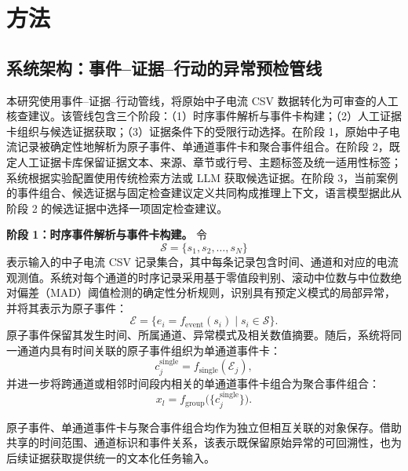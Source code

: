 \section{方法}
\subsection{系统架构：事件--证据--行动的异常预检管线}

本研究使用事件--证据--行动管线，将原始中子电流 CSV 数据转化为可审查的人工核查建议。该管线包含三个阶段：（1）时序事件解析与事件卡构建；（2）人工证据卡组织与候选证据获取；（3）证据条件下的受限行动选择。在阶段 1，原始中子电流记录被确定性地解析为原子事件、单通道事件卡和聚合事件组合。在阶段 2，既定人工证据卡库保留证据文本、来源、章节或行号、主题标签及统一适用性标签；系统根据实验配置使用传统检索方法或 LLM 获取候选证据。在阶段 3，当前案例的事件组合、候选证据与固定检查建议定义共同构成推理上下文，语言模型据此从阶段 2 的候选证据中选择一项固定检查建议。

\textbf{阶段 1：时序事件解析与事件卡构建。}
令
\begin{equation}
\mathcal{S}=\{s_1,s_2,\ldots,s_N\}
\label{eq:input-records}
\end{equation}
表示输入的中子电流 CSV 记录集合，其中每条记录包含时间、通道和对应的电流观测值。系统对每个通道的时序记录采用基于零值段判别、滚动中位数与中位数绝对偏差（MAD）阈值检测的确定性分析规则，识别具有预定义模式的局部异常，并将其表示为原子事件：
\begin{equation}
\mathcal{E}=\{e_i=f_{\mathrm{event}}(s_i)\mid s_i\in\mathcal{S}\}.
\label{eq:atomic-events}
\end{equation}
原子事件保留其发生时间、所属通道、异常模式及相关数值摘要。随后，系统将同一通道内具有时间关联的原子事件组织为单通道事件卡：
\begin{equation}
c^{\mathrm{single}}_j=f_{\mathrm{single}}(\mathcal{E}_j),
\label{eq:single-channel-cards}
\end{equation}
并进一步将跨通道或相邻时间段内相关的单通道事件卡组合为聚合事件组合：
\begin{equation}
x_l=f_{\mathrm{group}}\bigl(\{c^{\mathrm{single}}_j\}\bigr).
\label{eq:event-groups}
\end{equation}

原子事件、单通道事件卡与聚合事件组合均作为独立但相互关联的对象保存。借助共享的时间范围、通道标识和事件关系，该表示既保留原始异常的可回溯性，也为后续证据获取提供统一的文本化任务输入。

